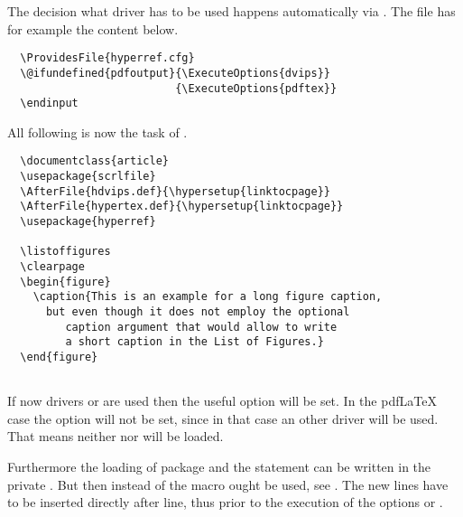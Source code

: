 \begin{Example}
  The decision what  driver has to be used
  happens automatically via .
  The file has for example the content below.
\begin{lstlisting}
  \ProvidesFile{hyperref.cfg}
  \@ifundefined{pdfoutput}{\ExecuteOptions{dvips}}
                          {\ExecuteOptions{pdftex}}
  \endinput
\end{lstlisting}

  All following is now the task of .
\begin{lstlisting}
  \documentclass{article}
  \usepackage{scrlfile}
  \AfterFile{hdvips.def}{\hypersetup{linktocpage}}
  \AfterFile{hypertex.def}{\hypersetup{linktocpage}}
  \usepackage{hyperref}
  
  \listoffigures
  \clearpage
  \begin{figure}
    \caption{This is an example for a long figure caption,
      but even though it does not employ the optional
         caption argument that would allow to write
         a short caption in the List of Figures.}
  \end{figure}
  
\end{lstlisting}
  If now  drivers  or
   are used then the useful  option
   will be set.
  In the pdf\LaTeX{} case the option will not be set, since
  in that case an other  driver 
  will be used. That means neither  nor
   will be loaded.
\end{Example}

\begin{Explain}
  Furthermore the loading of package 
  and the  statement can be written
  in the private .
  But then instead of  the macro
   ought be used, see \cite{latex:clsguide}.
  The new lines have to be inserted directly after 
   line, thus prior to the execution
  of the options  or .
\end{Explain}%

